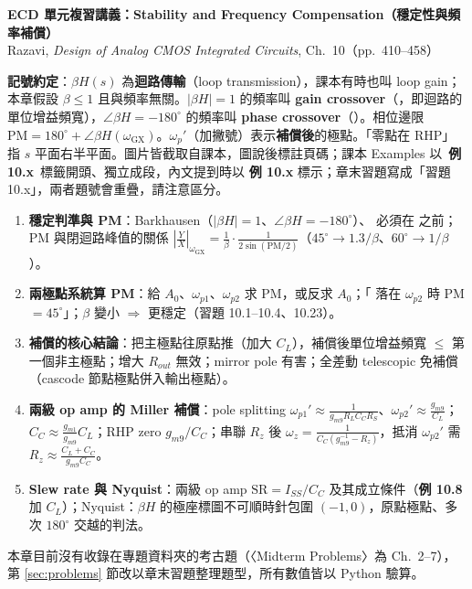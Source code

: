 \documentclass[11pt,a4paper]{article}
\newcommand{\GX}{\text{GX}}
\newcommand{\PX}{\text{PX}}
\newcommand{\extag}[1]{\colorbox{extagbg}{\textcolor{extag}{\sffamily\bfseries\,例 #1\,}}}
\newcommand{\exref}[1]{\textcolor{extag}{\textbf{\sffamily 例 #1}}}
\begin{document}
\begin{center}{\LARGE\bfseries\sffamily ECD 單元複習講義：Stability and Frequency Compensation（穩定性與頻率補償）}\\[0.3em]{\large Razavi, \emph{Design of Analog CMOS Integrated Circuits}, Ch.~10（pp.~410--458）}\end{center}

\textbf{記號約定}：$\beta H(s)$ 為\textbf{迴路傳輸}（loop transmission），課本有時也叫 loop gain；本章假設 $\beta\le1$ 且與頻率無關。$|\beta H|=1$ 的頻率叫 \textbf{gain crossover}（\GX，即迴路的單位增益頻寬），$\angle\beta H=-180^\circ$ 的頻率叫 \textbf{phase crossover}（\PX）。相位邊限 $\text{PM}=180^\circ+\angle\beta H(\omega_{\GX})$。$\omega_p'$（加撇號）表示\textbf{補償後}的極點。「零點在 RHP」指 $s$ 平面右半平面。圖片皆截取自課本，圖說後標註頁碼；課本 Examples 以 \extag{10.x} 標籤開頭、獨立成段，內文提到時以 \exref{10.x} 標示；章末習題寫成「習題 10.x」，兩者題號會重疊，請注意區分。

\begin{takeaway}[考試重點地圖]
\begin{enumerate}[leftmargin=2.2em]
  \item \textbf{穩定判準與 PM}：Barkhausen（$|\beta H|=1$、$\angle\beta H=-180^\circ$）、\GX{} 必須在 \PX{} 之前；PM 與閉迴路峰值的關係 $\left|\frac{Y}{X}\right|_{\omega_{\GX}}=\frac{1}{\beta}\cdot\frac{1}{2\sin(\text{PM}/2)}$（$45^\circ\to1.3/\beta$、$60^\circ\to1/\beta$）。
  \item \textbf{兩極點系統算 PM}：給 $A_0$、$\omega_{p1}$、$\omega_{p2}$ 求 PM，或反求 $A_0$；「\GX{} 落在 $\omega_{p2}$ 時 PM $=45^\circ$」；$\beta$ 變小 $\Rightarrow$ 更穩定（習題 10.1--10.4、10.23）。
  \item \textbf{補償的核心結論}：把主極點往原點推（加大 $C_L$），補償後單位增益頻寬 $\le$ 第一個非主極點；增大 $R_{out}$ 無效；mirror pole 有害；全差動 telescopic 免補償（cascode 節點極點併入輸出極點）。
  \item \textbf{兩級 op amp 的 Miller 補償}：pole splitting $\omega_{p1}'\approx\frac{1}{g_{m9}R_LC_CR_S}$、$\omega_{p2}'\approx\frac{g_{m9}}{C_L}$；$C_C\approx\frac{g_{m1}}{g_{m9}}C_L$；RHP zero $g_{m9}/C_C$；串聯 $R_z$ 後 $\omega_z=\frac{1}{C_C(g_{m9}^{-1}-R_z)}$，抵消 $\omega_{p2}'$ 需 $R_z\approx\frac{C_L+C_C}{g_{m9}C_C}$。
  \item \textbf{Slew rate 與 Nyquist}：兩級 op amp $\text{SR}=I_{SS}/C_C$ 及其成立條件（\exref{10.8} 加 $C_L$）；Nyquist：$\beta H$ 的極座標圖不可順時針包圍 $(-1,0)$，原點極點、多次 $180^\circ$ 交越的判法。
\end{enumerate}
本章目前沒有收錄在專題資料夾的考古題（〈Midterm Problems〉為 Ch.~2--7），第 \ref{sec:problems} 節改以章末習題整理題型，所有數值皆以 Python 驗算。
\end{takeaway}
\end{document}

